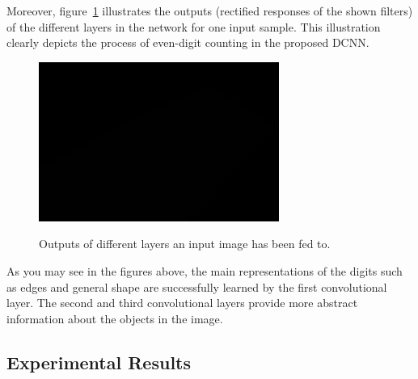 \noindent Moreover, figure~\ref{fig:convha} illustrates the outputs (rectified responses of the shown filters) of the different layers in the network for one input sample. This illustration clearly depicts the process of even-digit counting in the proposed DCNN. 

\begin{figure}[H]
	\centering
	{\includegraphics[width=0.7\textwidth]{images/1}}
	\caption{Outputs of different layers an input image has been fed to. }
	\label{fig:convha}
\end{figure}

As you may see in the figures above, the main representations of the digits such as edges and general shape are successfully learned by the first convolutional layer. The second and third  convolutional layers provide more abstract information about the objects in the image.




 



\subsection{Experimental Results}

